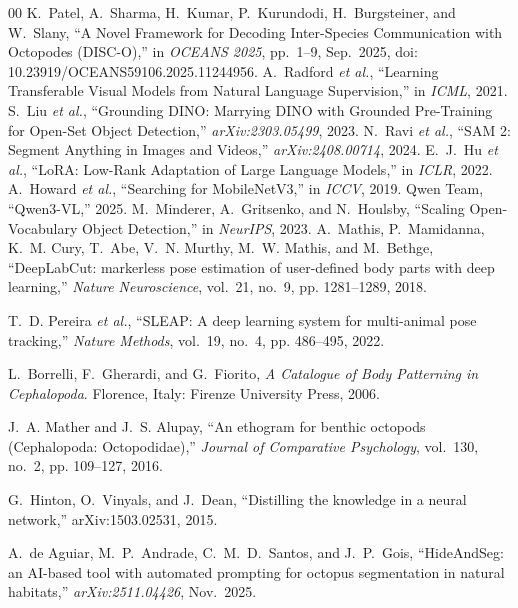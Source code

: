 \documentclass[conference]{IEEEtran}
\begin{document}
\begin{thebibliography}{00}
K.\ Patel, A.\ Sharma, H.\ Kumar, P.\ Kurundodi, H.\ Burgsteiner, and W.\ Slany,
``A Novel Framework for Decoding Inter-Species Communication with Octopodes
(DISC-O),'' in \textit{OCEANS 2025}, pp.\ 1--9, Sep.\ 2025,
doi: 10.23919/OCEANS59106.2025.11244956.
A.\ Radford \textit{et al.}, ``Learning Transferable Visual Models from Natural
Language Supervision,'' in \textit{ICML}, 2021.
S.\ Liu \textit{et al.}, ``Grounding DINO: Marrying DINO with Grounded Pre-Training
for Open-Set Object Detection,'' \textit{arXiv:2303.05499}, 2023.
N.\ Ravi \textit{et al.}, ``SAM 2: Segment Anything in Images and Videos,''
\textit{arXiv:2408.00714}, 2024.
E.\ J.\ Hu \textit{et al.}, ``LoRA: Low-Rank Adaptation of Large Language Models,''
in \textit{ICLR}, 2022.
A.\ Howard \textit{et al.}, ``Searching for MobileNetV3,'' in \textit{ICCV}, 2019.
Qwen Team, ``Qwen3-VL,'' 2025.
M.\ Minderer, A.\ Gritsenko, and N.\ Houlsby, ``Scaling Open-Vocabulary Object
Detection,'' in \textit{NeurIPS}, 2023.
A.~Mathis, P.~Mamidanna, K.~M. Cury, T.~Abe, V.~N. Murthy, M.~W. Mathis, and
M.~Bethge, ``DeepLabCut: markerless pose estimation of user-defined body parts
with deep learning,'' \emph{Nature Neuroscience}, vol.~21, no.~9, pp.
1281--1289, 2018.

T.~D. Pereira \emph{et al.}, ``SLEAP: A deep learning system for multi-animal
pose tracking,'' \emph{Nature Methods}, vol.~19, no.~4, pp. 486--495, 2022.

L.~Borrelli, F.~Gherardi, and G.~Fiorito, \emph{A Catalogue of Body Patterning
in Cephalopoda}. Florence, Italy: Firenze University Press, 2006.

J.~A. Mather and J.~S. Alupay, ``An ethogram for benthic octopods (Cephalopoda:
Octopodidae),'' \emph{Journal of Comparative Psychology}, vol.~130, no.~2, pp.
109--127, 2016.

G.~Hinton, O.~Vinyals, and J.~Dean, ``Distilling the knowledge in a neural
network,'' arXiv:1503.02531, 2015.

A.\ de Aguiar, M.\ P.\ Andrade, C.\ M.\ D.\ Santos, and J.\ P.\ Gois,
``HideAndSeg: an AI-based tool with automated prompting for octopus segmentation
in natural habitats,'' \textit{arXiv:2511.04426}, Nov.\ 2025.
\end{thebibliography}
\end{document}
